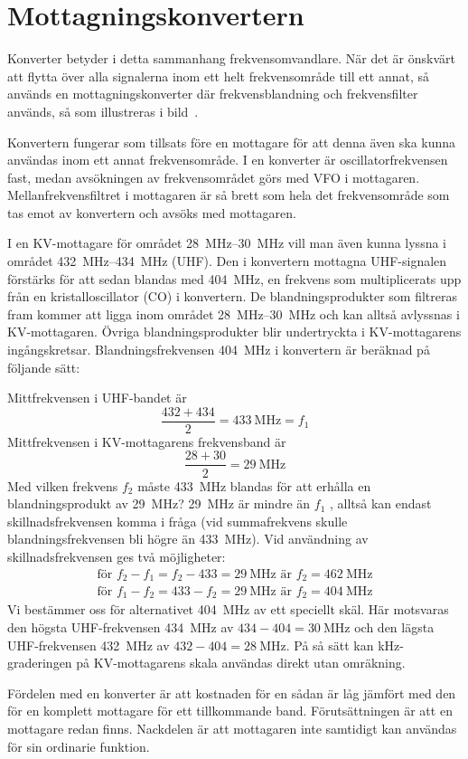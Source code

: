 \section{Mottagningskonvertern}


Konverter betyder i detta sammanhang frekvensomvandlare.
När det är önskvärt att flytta över alla signalerna inom ett helt frekvensområde
till ett annat, så används en mottagningskonverter där frekvensblandning och
frekvensfilter används, så som illustreras i bild~.

Konvertern fungerar som tillsats före en mottagare för att denna även
ska kunna användas inom ett annat frekvensområde.
I en konverter är oscillatorfrekvensen fast, medan avsökningen av
frekvensområdet görs med VFO i mottagaren.
Mellanfrekvensfiltret i mottagaren är så brett som hela det frekvensområde
som tas emot av konvertern och avsöks med mottagaren.

\begin{tcolorbox}[enhanced jigsaw,breakable,title=Exempel]
I en KV-mottagare för området \SIrange{28}{30}{\mega\hertz} vill man även kunna
lyssna i området \SIrange{432}{434}{\mega\hertz} (UHF).
Den i konvertern mottagna UHF-signalen förstärks för att sedan blandas med
\qty{404}{\mega\hertz}, en frekvens som multiplicerats upp från en
kristalloscillator (CO) i konvertern.
De blandningsprodukter som filtreras fram kommer att ligga inom området
\SIrange{28}{30}{\mega\hertz} och kan alltså avlyssnas i KV-mottagaren.
Övriga blandningsprodukter blir undertryckta i KV-mottagarens ingångskretsar.
Blandningsfrekvensen \qty{404}{\mega\hertz} i konvertern är beräknad på följande
sätt:

\noindent
Mittfrekvensen i UHF-bandet är
\[\frac{432+434}{2} = \qty{433}{\mega\hertz} = f_1\]
Mittfrekvensen i KV-mottagarens frekvensband är
\[\frac{28 + 30}{2} = \qty{29}{\mega\hertz}\]
Med vilken frekvens \(f_2\) måste \qty{433}{\mega\hertz} blandas för att erhålla
en blandningsprodukt av \qty{29}{\mega\hertz}?
\qty{29}{\mega\hertz} är mindre än \(f_1\) , alltså kan endast
skillnadsfrekvensen komma i fråga (vid summafrekvens skulle blandningsfrekvensen
bli högre än \qty{433}{\mega\hertz}).
Vid användning av skillnadsfrekvensen ges två möjligheter:
\begin{gather*}
  \text{för }f_2 - f_1 = f_2 - 433 = \qty{29}{\mega\hertz}\text{ är }f_2 = \qty{462}{\mega\hertz} \\
  \text{för }f_1 - f_2 = 433 - f_2 = \qty{29}{\mega\hertz}\text{ är }f_2 = \qty{404}{\mega\hertz}
\end{gather*}
Vi bestämmer oss för alternativet \qty{404}{\mega\hertz} av ett speciellt skäl.
Här motsvaras den högsta UHF-frekvensen \qty{434}{\mega\hertz} av \(434 - 404 =
\qty{30}{\mega\hertz}\) och den lägsta UHF-frekvensen \qty{432}{\mega\hertz} av
\(432 - 404 = \qty{28}{\mega\hertz}\).
På så sätt kan kHz-graderingen på KV-mottagarens skala användas direkt utan
omräkning.
\end{tcolorbox}

Fördelen med en konverter är att kostnaden för en sådan är låg jämfört
med den för en komplett mottagare för ett tillkommande band.
Förutsättningen är att en mottagare redan finns.
Nackdelen är att mottagaren inte samtidigt kan användas för sin
ordinarie funktion.
